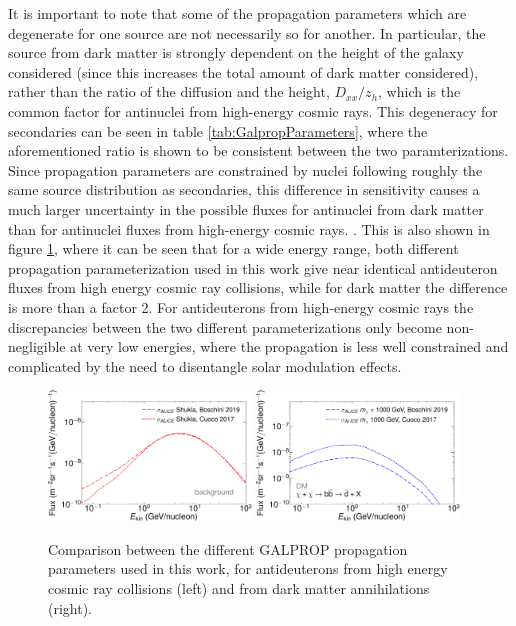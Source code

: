 It is important to note that some of the propagation parameters which are degenerate for one source are not necessarily so for another. In particular, the source from dark matter is strongly dependent on the height of the galaxy considered (since this increases the total amount of dark matter considered), rather than the ratio of the diffusion and the height, $D_{xx}/z_h$, which is the common factor for antinuclei from high-energy cosmic rays. This degeneracy for secondaries can be seen in table \ref{tab:GalpropParameters}, where the aforementioned  ratio is shown to be consistent between the two paramterizations. Since propagation parameters are constrained by nuclei following roughly the same source distribution as secondaries, this difference in sensitivity causes a much larger uncertainty in the possible fluxes for antinuclei from dark matter than for antinuclei fluxes from high-energy cosmic rays. \cite{}. This is also shown in figure \ref{fig:ComparisonPropagation}, where it can be seen that for a wide energy range, both different propagation parameterization used in this work give near identical antideuteron fluxes from high energy cosmic ray collisions, while for dark matter the difference is more than a factor 2. For antideuterons from high-energy cosmic rays the discrepancies between the two different parameterizations only become non-negligible at very low energies, where the propagation is less well constrained and complicated by the need to disentangle solar modulation effects. 

\begin{figure}[hbtp]
    \centering
    \includegraphics[width=0.48\textwidth]{figures/ComparisonPropagationBoschini.pdf}
    \includegraphics[width=0.48\textwidth]{figures/ComparisonPropagationBoschiniDM.pdf}
    \caption{Comparison between the different GALPROP propagation parameters used in this work, for antideuterons from high energy cosmic ray collisions (left) and from dark matter annihilations (right).}
    \label{fig:ComparisonPropagation}
\end{figure}

